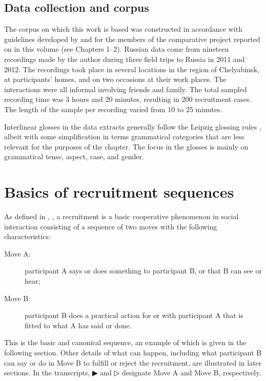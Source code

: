 \documentclass[output=paper,modfonts,nonflat]{langsci/langscibook}
\begin{document}
\subsection{Data collection and corpus}

The corpus on which this work is based was constructed in accordance with guidelines developed by and for the members of the comparative project reported on in this volume (see Chapters 1--2). Russian data come from nineteen recordings made by the author during three field trips to Russia in 2011 and 2012. The recordings took place in several locations in the region of Chelyabinsk, at participants’ homes, and on two occasions at their work places. The interactions were all informal involving friends and family. The total sampled recording time was 3 hours and 20 minutes, resulting in 200 recruitment cases. The length of the sample per recording varied from 10 to 25 minutes.

Interlinear glosses in the data extracts generally follow the Leipzig glossing rules \citep{comrie_leipzig_2020}, albeit with some simplification in terms grammatical categories that are less relevant for the purposes of the chapter. The focus in the glosses is mainly on grammatical tense, aspect, case, and gender.

\section{Basics of recruitment sequences}

As defined in , , a recruitment is a basic cooperative phenomenon in social interaction consisting of a sequence of two moves with the following characteristics:

\begin{description}
\item[Move A:] participant A says or does something to participant B, or that B can see or hear;
\item[Move B:] participant B does a practical action for or with participant A that is fitted to what A has said or done.
\end{description}

This is the basic and canonical sequence, an example of which is given in the following section. Other details of what can happen, including what participant B can say or do in Move B to fulfill or reject the recruitment, are illustrated in later sections. In the transcripts, ▶ and ▷ designate Move A and Move B, respectively.
\end{document}
